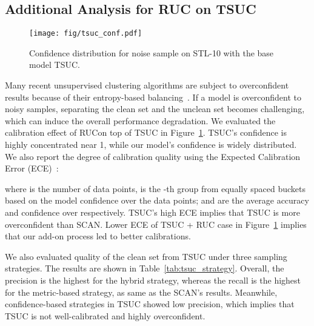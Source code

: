 \documentclass[final]{cvpr}
\newcommand{\model}{\textsf{RUC}}
\begin{document}
\subsection{Additional Analysis for RUC on TSUC}
\begin{figure}[h!]
\centering
\captionsetup{width=.9\linewidth}
\texttt{[image: fig/tsuc\_conf.pdf]}
    \caption{Confidence distribution for noise sample on STL-10 with the base model TSUC.}
    \label{fig:tsuc_conf}
\end{figure}

Many recent unsupervised clustering algorithms are subject to overconfident results because of their entropy-based balancing~\cite{hanmitigating,van2020scan}. If a model is overconfident to noisy samples, separating the clean set and the unclean set becomes challenging, which can induce the overall performance degradation. We evaluated the calibration effect of \model \space on top of TSUC in Figure~\ref{fig:tsuc_conf}. TSUC's confidence is highly concentrated near 1, while our model's confidence is widely distributed. We also report the degree of calibration quality using the Expected Calibration Error (ECE)~\cite{guo2017calibration}:

 where  is the number of data points,  is the -th group from equally spaced buckets based on the model confidence over the data points;  and  are the average accuracy and confidence over  respectively. TSUC's high ECE implies that TSUC is more overconfident than SCAN.  
Lower ECE of TSUC + \model{} case in Figure~\ref{fig:tsuc_conf} implies that our add-on process led to better calibrations. 

We also evaluated quality of the clean set from TSUC under three sampling strategies. The results are shown in Table~\ref{tab:tsuc_strategy}. Overall, the precision is the highest for the hybrid strategy, whereas the recall is the highest for the metric-based strategy, as same as the SCAN's results. Meanwhile, confidence-based strategies in TSUC showed low precision, which implies that TSUC is not well-calibrated and highly overconfident. 
\end{document}
